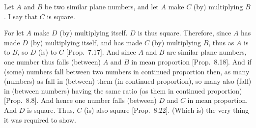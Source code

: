 \begin{Parallel}{}{}
{\epsfysize=1.2in
\centerline{}

Let $A$ and $B$ be two similar plane numbers, and let $A$ make $C$
(by) multiplying $B$. I say that $C$ is square.

For let $A$ make $D$ (by) multiplying itself. $D$ is thus square. Therefore, since $A$ has made $D$ (by) multiplying itself, and
has made $C$ (by) multiplying $B$, thus as $A$ is to $B$, so $D$ (is) to $C$ [Prop.~7.17]. And since $A$ and $B$ are similar
plane numbers, one number thus falls (between) $A$ and $B$ in mean
proportion [Prop.~8.18]. And if (some) numbers fall between two  numbers in continued proportion then, as many (numbers)
as fall in  (between) them (in continued proportion), so many also (fall) in (between numbers) having
the same ratio (as them in continued proportion)  [Prop.~8.8].
And hence one number falls (between) $D$ and $C$ in mean proportion.
And $D$ is  square. Thus, $C$ (is) also  square [Prop.~8.22]. (Which is)
the very thing it was required to show.}
\end{Parallel}

